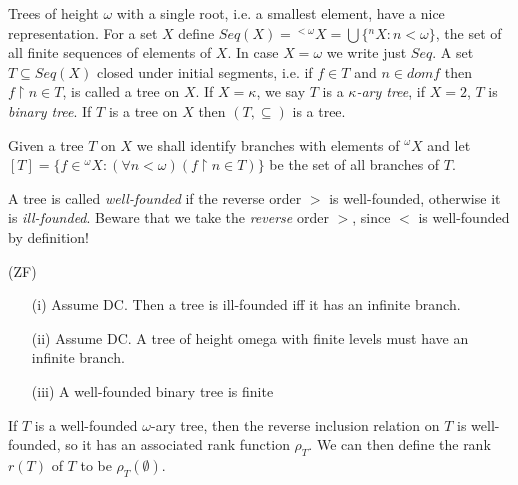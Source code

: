 \begin{example}\label{Seq}
Trees of height $\omega$ with a single root, i.e. a smallest element, have a nice representation.
For a set $X$ define $Seq(X)={}^{<\omega}X=\bigcup\{{}^nX:n<\omega\}$,
the set of all finite sequences of
elements of $X$. In case $X=\omega$ we write just $Seq$. A set
$T\subseteq Seq(X)$ closed under initial segments,
i.e. if $f\in T$ and $n\in dom f$ then $f\upharpoonright n\in T$,
is called a tree on $X$. If $X=\kappa$, we say $T$ is a
\emph{$\kappa$-ary tree}, if $X=2$, $T$ is \emph{binary tree}.
If $T$ is a tree on $X$ then  $(T,\subseteq)$ is a tree.

Given a tree $T$ on $X$ we shall identify branches with
elements of ${}^\omega X$ and let $[T]=\{f\in {}^\omega X:(\forall n<\omega)(f\upharpoonright n\in T)\}$
be the set of all branches of $T$.

\end{example}


\begin{definition} A tree is called \emph{well-founded} if the reverse order $>$ is well-founded, otherwise it is \emph{ill-founded}. Beware that we take the
\emph{reverse} order $>$, since $<$ is well-founded by definition!
\end{definition}

\begin{fact}{\rm {(ZF)} }
\begin{itemize}
 \item[(i)] Assume DC. Then a tree is ill-founded iff it has an infinite branch.
 \item[(ii)] Assume DC. A tree of height omega with finite levels must have an infinite branch.
 \item[(iii)] A well-founded binary tree is finite
\end{itemize}


\end{fact}


\begin{example} If $T$ is a well-founded $\omega$-ary tree, then the reverse
inclusion relation on $T$ is
 well-founded, so it has an associated rank function $\rho_T$.
We can then define the rank $r(T)$
 of $T$ to be $\rho_T(\emptyset)$.
\end{example}

